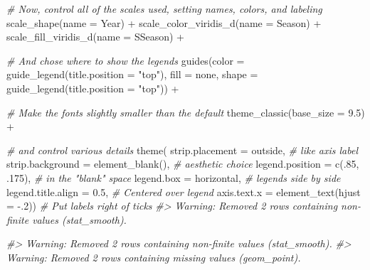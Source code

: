 \documentclass[
]{article}
\newenvironment{Shaded}{\begin{snugshade}}{\end{snugshade}}
\newcommand{\AttributeTok}[1]{\textcolor[rgb]{0.77,0.63,0.00}{#1}}
\newcommand{\CommentTok}[1]{\textcolor[rgb]{0.56,0.35,0.01}{\textit{#1}}}
\newcommand{\DecValTok}[1]{\textcolor[rgb]{0.00,0.00,0.81}{#1}}
\newcommand{\FloatTok}[1]{\textcolor[rgb]{0.00,0.00,0.81}{#1}}
\newcommand{\FunctionTok}[1]{\textcolor[rgb]{0.00,0.00,0.00}{#1}}
\newcommand{\NormalTok}[1]{#1}
\newcommand{\SpecialCharTok}[1]{\textcolor[rgb]{0.00,0.00,0.00}{#1}}
\newcommand{\StringTok}[1]{\textcolor[rgb]{0.31,0.60,0.02}{#1}}
\begin{document}
\begin{Shaded}
\begin{Highlighting}[]
  \CommentTok{\# Now, control all of the scales used, setting names, colors, and labeling}
  \FunctionTok{scale\_shape}\NormalTok{(}\AttributeTok{name =} \StringTok{\textquotesingle{}Year\textquotesingle{}}\NormalTok{) }\SpecialCharTok{+}
  \FunctionTok{scale\_color\_viridis\_d}\NormalTok{(}\AttributeTok{name =} \StringTok{\textquotesingle{}Season\textquotesingle{}}\NormalTok{) }\SpecialCharTok{+}
  \FunctionTok{scale\_fill\_viridis\_d}\NormalTok{(}\AttributeTok{name =} \StringTok{\textquotesingle{}SSeason\textquotesingle{}}\NormalTok{) }\SpecialCharTok{+}
  
  \CommentTok{\# And chose where to show the legends}
  \FunctionTok{guides}\NormalTok{(}\AttributeTok{color =} \FunctionTok{guide\_legend}\NormalTok{(}\AttributeTok{title.position =} \StringTok{"top"}\NormalTok{),}
         \AttributeTok{fill =} \StringTok{\textquotesingle{}none\textquotesingle{}}\NormalTok{,}
         \AttributeTok{shape =} \FunctionTok{guide\_legend}\NormalTok{(}\AttributeTok{title.position =} \StringTok{"top"}\NormalTok{)) }\SpecialCharTok{+}
  
  \CommentTok{\# Make the fonts slightly smaller than the default}
  \FunctionTok{theme\_classic}\NormalTok{(}\AttributeTok{base\_size =} \FloatTok{9.5}\NormalTok{) }\SpecialCharTok{+}
  
  \CommentTok{\# and control various details}
  \FunctionTok{theme}\NormalTok{( }\AttributeTok{strip.placement =} \StringTok{\textquotesingle{}outside\textquotesingle{}}\NormalTok{,         }\CommentTok{\# like axis label}
         \AttributeTok{strip.background =} \FunctionTok{element\_blank}\NormalTok{(),  }\CommentTok{\# aesthetic choice}
         \AttributeTok{legend.position =} \FunctionTok{c}\NormalTok{(.}\DecValTok{85}\NormalTok{, .}\DecValTok{175}\NormalTok{),      }\CommentTok{\# in the "blank" space}
         \AttributeTok{legend.box =} \StringTok{\textquotesingle{}horizontal\textquotesingle{}}\NormalTok{,           }\CommentTok{\# legends side by side}
         \AttributeTok{legend.title.align =} \FloatTok{0.5}\NormalTok{,            }\CommentTok{\# Centered over legend}
         \AttributeTok{axis.text.x =} \FunctionTok{element\_text}\NormalTok{(}\AttributeTok{hjust =} \SpecialCharTok{{-}}\NormalTok{.}\DecValTok{2}\NormalTok{))  }\CommentTok{\# Put labels right of ticks}
\CommentTok{\#\textgreater{} Warning: Removed 2 rows containing non{-}finite values (stat\_smooth).}

\CommentTok{\#\textgreater{} Warning: Removed 2 rows containing non{-}finite values (stat\_smooth).}
\CommentTok{\#\textgreater{} Warning: Removed 2 rows containing missing values (geom\_point).}
\end{Highlighting}
\end{Shaded}
\end{document}
